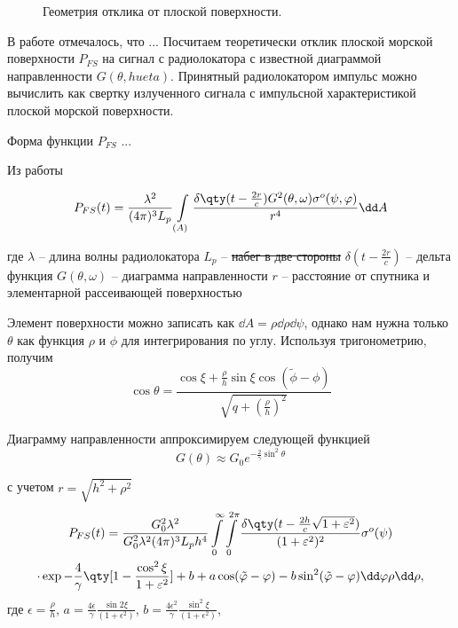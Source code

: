 \begin{figure}[h]
    \centering
    \caption{Геометрия отклика от плоской поверхности.}
    \label{fig:geometry}
\end{figure}
В работе \cite{brown} отмечалось, что ...
Посчитаем теоретически отклик плоской морской поверхности $P_{FS}$ на сигнал с
радиолокатора с известной диаграммой направленности $G(\theta,hueta)$.
Принятный радиолокатором импульс можно вычислить как свертку излученного
сигнала с импульсной характеристикой плоской морской поверхности.


Форма функции $P_{FS}$ ... 

Из работы \cite{moore-and-williams} 

\begin{equation}
    P_{FS}(t) = \frac{\lambda^2}{(4 \pi)^3 L_p} \int\limits_{(A)} 
    \frac
        {\delta\qty(t - \frac{2r}{c}) G^2(\theta,\omega) \sigma^o(\psi,\phi)}
        {r^4} 
    \dd A
\end{equation}

где
$\lambda$ -- длина волны радиолокатора
$L_p$ -- \sout{набег в две стороны} 
$\delta(t - \frac{2r}{c})$ -- дельта функция
$G(\theta, \omega)$ -- диаграмма направленности
 $r$ -- расстояние от спутника и элементарной рассеивающей поверхностью

 Элемент поверхности можно записать как $\dd A = \rho \dd \rho \dd \psi$,
 однако нам нужна  только $\theta$ как функция $\rho$ и $\phi$ для
 интегрирования по углу. Используя тригонометрию, получим
 \begin{equation}
     \label{eq:}
     \cos \theta = 
     \frac{\cos \xi + \frac{\rho}{h} \sin \xi \cos(\tilde \phi - \phi)}{\sqrt{q
     + (\frac{\rho}{h})^2}}
 \end{equation}


 Диаграмму направленности аппроксимируем следующей функцией
 \begin{equation}
     \label{eq:}
     G(\theta) \approx G_0 e^{-\frac{2}{\gamma} \sin^2 \theta}
 \end{equation}

 с учетом $r = \sqrt{h^{2} + \rho^{2}}$ 
 \begin{multline}
     P_{FS}(t) = \frac{G_0^2\lambda^2}{G_0^2 \lambda^2 (4 \pi)^3 L_p h^4}
     \int\limits_{0}^{\infty} \int\limits_{0}^{2 \pi}   
     \frac{\delta\qty(t - \frac{2h}{c}\sqrt{1+ \epsilon^2})}{(1+\epsilon^2)^2} \sigma^o(\psi)
     \\
     \cdot \exp{-\frac{4}{\gamma} \qty[1 - \frac{\cos^2 \xi}{1+ \epsilon^2}] + b
     + a\cos(\tilde \phi - \phi) - b \sin^2(\tilde \phi - \phi)} \dd \phi \rho
     \dd \rho,
 \end{multline}
 где 
 $\epsilon = \frac{\rho}{h}$,
 $a = \frac{4\epsilon}{\gamma} \frac{\sin 2 \xi}{(1+ \epsilon^2)}$,
 $b= \frac{4\epsilon^2}{\gamma} \frac{\sin^2 \xi}{(1+\epsilon^2)}$,

